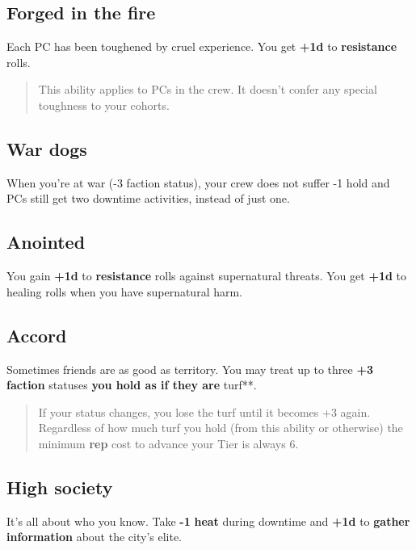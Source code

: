 \documentclass[11pt,fleqn,a5paper]{book}
\newcommand{\gameterm}[1]{\textbf{#1}}
\begin{document}
\subsection{Forged in the fire}

Each PC has been toughened by cruel experience. You get \textbf{+1d} to \textbf{resistance} rolls.

\begin{quote}
	This ability applies to PCs in the crew. It doesn’t confer any special toughness to your cohorts.
\end{quote} 

\subsection{War dogs}

When you’re at war (-3 faction status), your crew does not suffer -1 hold and PCs still get two downtime activities, instead of just one.

\subsection{Anointed}

You gain \textbf{+1d} to \textbf{resistance} rolls against supernatural threats. You get \textbf{+1d} to healing rolls when you have supernatural harm.

\subsection{Accord}

Sometimes friends are as good as territory. You may treat up to three \textbf{+3 faction} statuses\textbf{ you hold as if they are }turf**.

\begin{quote}
	If your status changes, you lose the turf until it becomes +3 again. Regardless of how much turf you hold (from this ability or otherwise) the minimum \gameterm{rep}  cost to advance your Tier is always 6.
\end{quote} 

\subsection{High society}

It’s all about who you know. Take \textbf{-1 }\gameterm{heat} \textbf{ }during downtime and \textbf{+1d} to \textbf{gather information} about the city’s elite.
\end{document}
